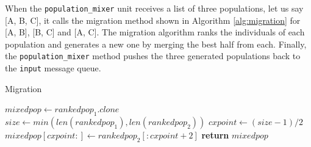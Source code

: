 \documentclass[runningheads]{llncs}
\begin{document}
When the \texttt{population\_mixer} unit receives a list of three
populations, let us say [A, B, C], it calls the migration method shown
in Algorithm \ref{alg:migration} for [A, B], [B, C] and [A, C]. The
migration algorithm ranks the individuals of each population and
generates a new one by merging the best half from each. Finally, the
\texttt{population\_mixer} method pushes the three generated
populations back to the \texttt{input} message queue.
%
\begin{algorithm} %
    \caption{Migration}
    \label{alg:migration}
    \begin{algorithmic}[1]
            \State $mixedpop \gets rankedpop_1.clone$
            \State $size\gets min(len(rankedpop_1), len(rankedpop_2))$
            \State $cxpoint\gets (size-1)/2$
            \State $mixedpop[cxpoint:]\gets rankedpop_2[:cxpoint+2]$
            \State \textbf{return} $mixedpop$
        \EndProcedure 
    \end{algorithmic}
\end{algorithm}
%
\end{document}
